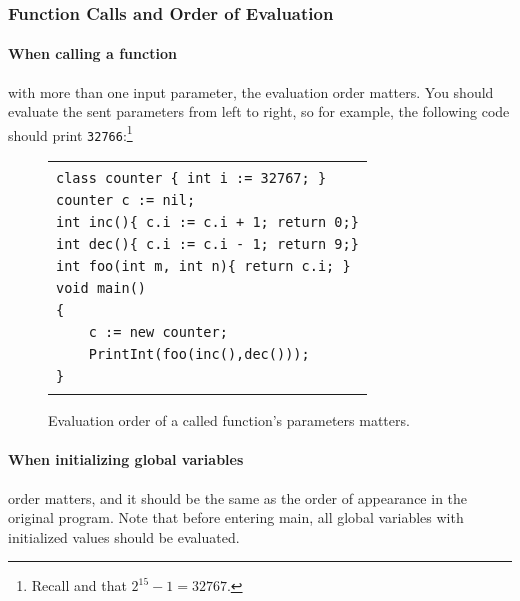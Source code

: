 \documentclass{article}
\begin{document}
\subsubsection{Function Calls and Order of Evaluation}
\label{subsection_Function_Calls_And_Order_Of_Evaluation}
\paragraph{When calling a function} with more than one input parameter,
the evaluation order matters. You should evaluate the sent parameters
from left to right, so for example, the following code should print \verb"32766":\footnote{Recall  and that $2^{15}-1=32767$.} 
\begin{figure}[h]
\centering
\begin{tabular}{|l|}
\hline
                                               \\
\verb"class counter { int i := 32767; }"       \\
\verb"counter c := nil;"                       \\
\verb"int inc(){ c.i := c.i + 1; return 0;}"   \\
\verb"int dec(){ c.i := c.i - 1; return 9;}"   \\
\verb"int foo(int m, int n){ return c.i; }"    \\
\verb"void main()"                             \\
\verb"{"                                       \\
\verb"    c := new counter;"                                       \\
\verb"    PrintInt(foo(inc(),dec()));"         \\
\verb"}"                                       \\
                                               \\
\hline
\end{tabular}
\caption{Evaluation order of a called function's parameters matters.
\label{Figure_Code_Example_Evaluation_Order_Function_Call}}
\end{figure}
\paragraph{When initializing global variables}
\label{Paragraph_When_Evaluating_Global_Variables}
order matters,
and it should be the same as the order of appearance in the original program.
Note that before entering main, all global variables with initialized values
should be evaluated.
\end{document}
